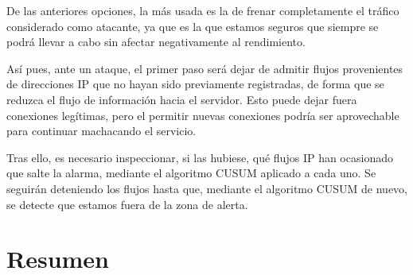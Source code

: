 De las anteriores opciones, la más usada es la de frenar completamente el tráfico considerado como atacante, ya que es 
la que estamos seguros que siempre se podrá llevar a cabo sin afectar negativamente al rendimiento.

Así pues, ante un ataque, el primer paso será dejar de admitir flujos provenientes de direcciones \gls{IP} que no 
hayan sido previamente registradas, de forma que se reduzca el flujo de información hacia el servidor. Esto puede dejar 
fuera conexiones legítimas, pero el permitir nuevas conexiones podría ser aprovechable para continuar machacando el 
servicio.

Tras ello, es necesario inspeccionar, si las hubiese, qué flujos \gls{IP} han ocasionado que salte la alarma, mediante 
el algoritmo \gls{CUSUM} aplicado a cada uno. Se seguirán deteniendo los flujos hasta que, mediante el algoritmo 
\gls{CUSUM} de nuevo, se detecte que estamos fuera de la zona de alerta.

\section{Resumen}%


